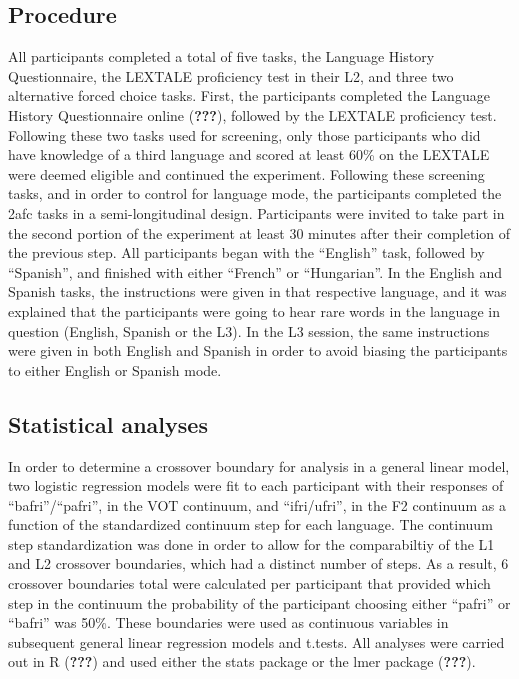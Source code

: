 \documentclass[
  english,
  man]{apa6}
\begin{document}
\hypertarget{procedure}{%
\subsection{Procedure}\label{procedure}}

All participants completed a total of five tasks, the Language History Questionnaire, the LEXTALE proficiency test in their L2, and three two alternative forced choice tasks. First, the participants completed the Language History Questionnaire online ({\textbf{???}}), followed by the LEXTALE proficiency test.
Following these two tasks used for screening, only those participants who did have knowledge of a third language and scored at least 60\% on the LEXTALE were deemed eligible and continued the experiment.
Following these screening tasks, and in order to control for language mode, the participants completed the 2afc tasks in a semi-longitudinal design.
Participants were invited to take part in the second portion of the experiment at least 30 minutes after their completion of the previous step.
All participants began with the \enquote{English} task, followed by \enquote{Spanish}, and finished with either \enquote{French} or \enquote{Hungarian}.
In the English and Spanish tasks, the instructions were given in that respective language, and it was explained that the participants were going to hear rare words in the language in question (English, Spanish or the L3).
In the L3 session, the same instructions were given in both English and Spanish in order to avoid biasing the participants to either English or Spanish mode.

\hypertarget{statistical-analyses}{%
\subsection{Statistical analyses}\label{statistical-analyses}}

In order to determine a crossover boundary for analysis in a general linear model, two logistic regression models were fit to each participant with their responses of \enquote{bafri}/\enquote{pafri}, in the VOT continuum, and \enquote{ifri/ufri}, in the F2 continuum as a function of the standardized continuum step for each language. The continuum step standardization was done in order to allow for the comparabiltiy of the L1 and L2 crossover boundaries, which had a distinct number of steps. As a result, 6 crossover boundaries total were calculated per participant that provided which step in the continuum the probability of the participant choosing either \enquote{pafri} or \enquote{bafri} was 50\%. These boundaries were used as continuous variables in subsequent general linear regression models and t.tests. All analyses were carried out in R ({\textbf{???}}) and used either the stats package or the lmer package ({\textbf{???}}).
\end{document}
